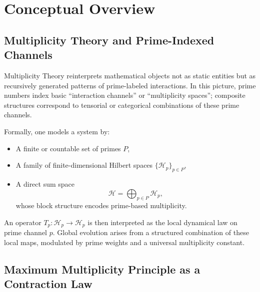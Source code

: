 \documentclass[12pt]{article}
\begin{document}
\begin{abstract}
The central theorem (Theorem~\ref{thm:finite-prime-mmp}) is deliberately stated in a minimal ``left-action'' form that is easy to prove and to implement numerically. More elaborate tensorial versions and categorical/topological refinements are described as natural extensions rather than prerequisites. This choice maximizes both defensibility (clear proof) and practical relevance (immediate code verification).
\end{abstract}
\tableofcontents

\newpage

\newpage

\section{Conceptual Overview}

\subsection{Multiplicity Theory and Prime-Indexed Channels}

Multiplicity Theory reinterprets mathematical objects not as static entities but as recursively generated patterns of prime-labeled interactions. In this picture, prime numbers index basic ``interaction channels'' or ``multiplicity spaces''; composite structures correspond to tensorial or categorical combinations of these prime channels.

Formally, one models a system by:

\begin{itemize}
  \item A finite or countable set of primes \(P\),
  \item A family of finite-dimensional Hilbert spaces \(\{\mathcal{H}_p\}_{p\in P}\),
  \item A direct sum space
        \[
          \mathcal{H} = \bigoplus_{p\in P} \mathcal{H}_p,
        \]
        whose block structure encodes prime-based multiplicity.
\end{itemize}

An operator \(T_p : \mathcal{H}_p \to \mathcal{H}_p\) is then interpreted as the local dynamical law on prime channel \(p\). Global evolution arises from a structured combination of these local maps, modulated by prime weights and a universal multiplicity constant.

\subsection{Maximum Multiplicity Principle as a Contraction Law}
\end{document}

